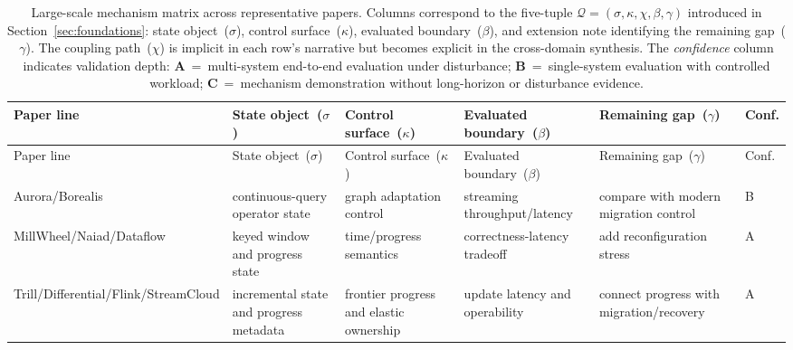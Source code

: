 \documentclass[acmsmall,screen,review]{acmart}
\begin{document}
\setlength{\tabcolsep}{1.5pt}
\scriptsize
\begin{longtable}{>{
\raggedright\arraybackslash}p{}>{
\raggedright\arraybackslash}p{}>{
\raggedright\arraybackslash}p{}>{
\raggedright\arraybackslash}p{}>{
\raggedright\arraybackslash}p{}>{
\raggedright\arraybackslash}p{}}
\caption{Large-scale mechanism matrix across representative papers. Columns correspond to the five-tuple $\mathcal{Q}=(\sigma,\kappa,\chi,\beta,\gamma)$ introduced in Section~\ref{sec:foundations}: state object~($\sigma$), control surface~($\kappa$), evaluated boundary~($\beta$), and extension note identifying the remaining gap~($\gamma$). The coupling path~($\chi$) is implicit in each row's narrative but becomes explicit in the cross-domain synthesis. The \emph{confidence} column indicates validation depth: \textbf{A}~=~multi-system end-to-end evaluation under disturbance; \textbf{B}~=~single-system evaluation with controlled workload; \textbf{C}~=~mechanism demonstration without long-horizon or disturbance evidence.}\label{tab:large-matrix-a}\\
\toprule
Paper line & State object~($\sigma$) & Control surface~($\kappa$) & Evaluated boundary~($\beta$) & Remaining gap~($\gamma$) & Conf. \\
\midrule
\endfirsthead
\toprule
Paper line & State object~($\sigma$) & Control surface~($\kappa$) & Evaluated boundary~($\beta$) & Remaining gap~($\gamma$) & Conf. \\
\midrule
\endhead
Aurora/Borealis~\cite{abadi2003aurora,abadi2005borealis} & continuous-query operator state & graph adaptation control & streaming throughput/latency & compare with modern migration control & B \\
MillWheel/Naiad/\newline Dataflow \newline \cite{akidau2013millwheel,murray2013naiad,akidau2015dataflow} & keyed window and progress state & time/progress semantics & correctness-latency tradeoff & add reconfiguration stress & A \\
Trill/Differential/\newline Flink/StreamCloud \newline \cite{chandramouli2014trill,murray2013differential,carbone2015flink,gulisano2012streamcloud} & incremental state and progress metadata & frontier progress and elastic ownership & update latency and operability & connect progress with migration/recovery & A \\

\end{longtable}
\end{document}
